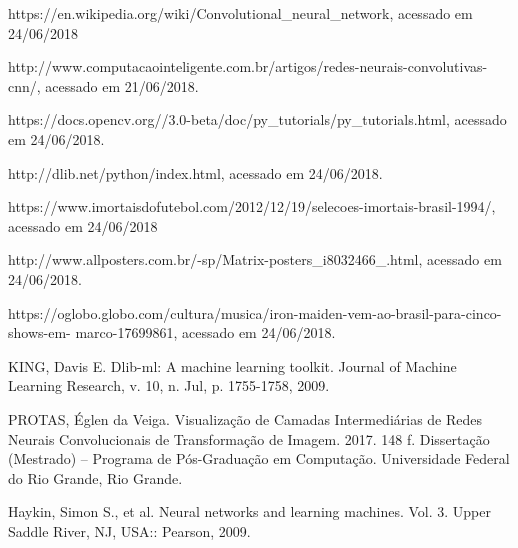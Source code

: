 \documentclass[conference]{IEEEtran}
\begin{document}
	  \begin{thebibliography}{00}

		 https://en.wikipedia.org/wiki/Convolutional\_neural\_network, acessado em 24/06/2018	  
	  		
		 http://www.computacaointeligente.com.br/artigos/redes-neurais-convolutivas-cnn/, acessado em 		        21/06/2018.
		
		 https://docs.opencv.org//3.0-beta/doc/py\_tutorials/py\_tutorials.html, acessado em 24/06/2018.
		
		 http://dlib.net/python/index.html, acessado em 24/06/2018.
		
		 https://www.imortaisdofutebol.com/2012/12/19/selecoes-imortais-brasil-1994/, acessado em                                                                   		24/06/2018
		
		 http://www.allposters.com.br/-sp/Matrix-posters\_i8032466\_.html, acessado em 24/06/2018.

		 https://oglobo.globo.com/cultura/musica/iron-maiden-vem-ao-brasil-para-cinco-shows-em-						marco-17699861, acessado em 24/06/2018.
		
		 KING, Davis E. Dlib-ml: A machine learning toolkit. Journal of Machine Learning Research, v. 10, 			n. Jul, p. 1755-1758, 2009.
		
		 PROTAS, Églen da Veiga. Visualização de Camadas Intermediárias de Redes Neurais
		Convolucionais de Transformação de Imagem. 2017. 148 f. Dissertação (Mestrado) –
		Programa de Pós-Graduação em Computação. Universidade Federal do Rio Grande, Rio
		Grande.
		
		 Haykin, Simon S., et al. Neural networks and learning machines. Vol. 3. Upper Saddle River, NJ, 			USA:: Pearson, 2009.

		
	  \end{thebibliography}
\end{document}
